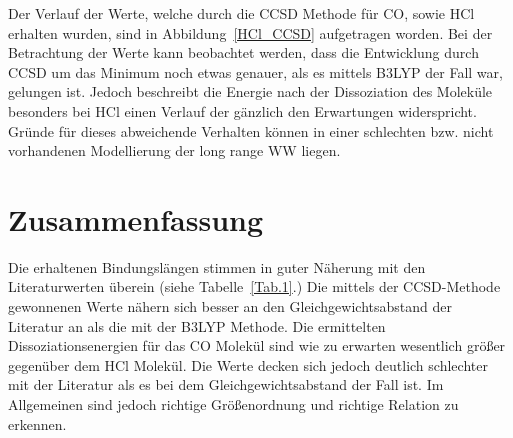 Der Verlauf der Werte, welche durch die CCSD Methode für CO, sowie HCl erhalten wurden, sind in Abbildung~\ref{HCl_CCSD} aufgetragen worden. Bei der Betrachtung der Werte kann beobachtet werden, dass die Entwicklung durch CCSD um das Minimum noch etwas genauer, als es mittels B3LYP der Fall war, gelungen ist. Jedoch beschreibt die Energie  nach der Dissoziation des Moleküle besonders bei HCl einen Verlauf der gänzlich den Erwartungen widerspricht. Gründe für dieses abweichende Verhalten können in einer schlechten bzw. nicht vorhandenen Modellierung der long range WW liegen.


\section{Zusammenfassung}

Die erhaltenen Bindungslängen stimmen in guter Näherung mit den Literaturwerten überein (siehe Tabelle~\ref{Tab.1}.) 
Die mittels der CCSD-Methode gewonnenen Werte nähern sich besser an den Gleichgewichtsabstand der Literatur an als die mit der B3LYP Methode. Die ermittelten Dissoziationsenergien für das CO Molekül sind wie zu erwarten wesentlich größer gegenüber dem HCl Molekül. Die Werte decken sich jedoch deutlich schlechter mit der Literatur als es bei dem Gleichgewichtsabstand der Fall ist. Im Allgemeinen sind jedoch richtige Größenordnung und richtige Relation zu erkennen.



 
 






%
